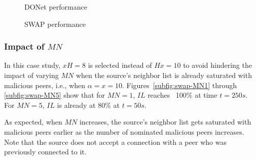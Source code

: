 \begin{figure}[t!]
\centering

  \mbox{}
  \mbox{}
  \mbox{}
  \mbox{}
   
  \caption{DONet performance}

  \label{fig:DONet}
  \end{figure}
  
\begin{figure}[t!]
\centering

  \mbox{}
  \mbox{}
  \mbox{}
  \mbox{}

  
  \caption{SWAP performance}

  \label{fig:swap}
  \end{figure}
    
\subsubsection{Impact of $MN$}

In this case study, $xH=8$ is selected instead of $Hx=10$ to avoid hindering the impact of varying $MN$ when the source's neighbor list is already saturated with malicious peers, i.e., when $\alpha=x=10$.
Figures~\ref{subfig:swap-MN1} through \ref{subfig:swap-MN5} show that for $MN=1$, $IL$ reaches ~100\% at time $t=250s$. 
For $MN=5$, $IL$ is already at 80\% at $t=50s$.

As expected, when $MN$ increases, the source's neighbor list gets saturated with malicious peers earlier as the number of nominated malicious peers increases.
Note that the source does not accept a connection with a peer who was previously connected to it.

